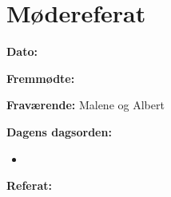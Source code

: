 \chapter{Mødereferat}

\textbf{Dato:} 

\textbf{Fremmødte:} 

\textbf{Fraværende:} Malene og Albert

\textbf{Dagens dagsorden:}
\begin{itemize}
	\item 
\end{itemize}

\textbf{Referat:}